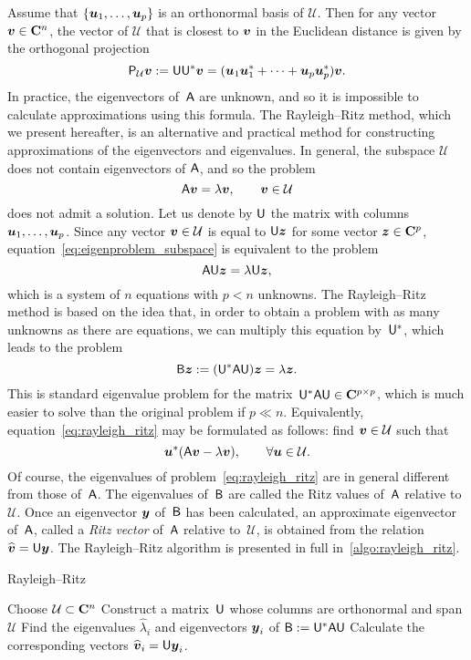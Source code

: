 Assume that $\{\mathbf{\boldsymbol{u}}_1, \dotsc, \mathbf{\boldsymbol{u}}_p\}$ is an orthonormal basis of $\mathcal U$.
Then for any vector $\mathbf{\boldsymbol{v}} \in \mathbf C^{n}$,
the vector of $\mathcal U$ that is closest to $\mathbf{\boldsymbol{v}}$ in the Euclidean distance is given by the orthogonal projection
\[
    \mathsf P_{\mathcal U} \mathbf{\boldsymbol{v}} := \mathsf U \mathsf U^* \mathbf{\boldsymbol{v}} = (\mathbf{\boldsymbol{u}}_1 \mathbf{\boldsymbol{u}}_1^* + \dotsb + \mathbf{\boldsymbol{u}}_p \mathbf{\boldsymbol{u}}_p^*) \mathbf{\boldsymbol{v}}.
\]
In practice,
the eigenvectors of~$\mathsf A$ are unknown,
and so it is impossible to calculate approximations using this formula.
The Rayleigh--Ritz method,
which we present hereafter,
is an alternative and practical method for constructing approximations of the eigenvectors and eigenvalues.
In general, the subspace $\mathcal U$ does not contain eigenvectors of $\mathsf A$,
and so the problem
\begin{equation}
    \label{eq:eigenproblem_subspace}
    \mathsf A \mathbf{\boldsymbol{v}} = \lambda \mathbf{\boldsymbol{v}}, \qquad \mathbf{\boldsymbol{v}} \in \mathcal U
\end{equation}
does not admit a solution.
Let us denote by $\mathsf U$ the matrix with columns~$\mathbf{\boldsymbol{u}}_1, \dotsc, \mathbf{\boldsymbol{u}}_p$.
Since any vector $\mathbf{\boldsymbol{v}} \in \mathcal U$ is equal to $\mathsf U \mathbf{\boldsymbol{z}}$ for some vector $\mathbf{\boldsymbol{z}} \in \mathbf C^p$,
equation~\eqref{eq:eigenproblem_subspace} is equivalent to the problem
\[
    \mathsf A \mathsf U \mathbf{\boldsymbol{z}} = \lambda \mathsf U \mathbf{\boldsymbol{z}},
\]
which is a system of $n$ equations with $p < n$ unknowns.
The Rayleigh--Ritz method is based on the idea that,
in order to obtain a problem with as many unknowns as there are equations,
we can multiply this equation by~$\mathsf U^*$,
which leads to the problem
\begin{equation}
    \label{eq:rayleigh_ritz}
    \mathsf B \mathbf{\boldsymbol{z}} := (\mathsf U^* \mathsf A \mathsf U) \mathbf{\boldsymbol{z}} = \lambda \mathbf{\boldsymbol{z}}.
\end{equation}
This is standard eigenvalue problem for the matrix~$\mathsf U^* \mathsf A \mathsf U \in \mathbf C^{p \times p}$,
which is much easier to solve than the original problem if $p \ll n$.
Equivalently, equation~\eqref{eq:rayleigh_ritz} may be formulated as follows: find $\mathbf{\boldsymbol{v}} \in \mathcal U$
such that
\[
    \mathbf{\boldsymbol{u}}^* (\mathsf A \mathbf{\boldsymbol{v}} - \lambda \mathbf{\boldsymbol{v}}), \qquad \forall \mathbf{\boldsymbol{u}} \in \mathcal U.
\]
Of course, the eigenvalues of problem~\eqref{eq:rayleigh_ritz} are in general different from those of~$\mathsf A$.
The eigenvalues of~$\mathsf B$ are called the Ritz values of~$\mathsf A$ relative to $\mathcal U$.
Once an eigenvector $\mathbf{\boldsymbol{y}}$ of~$\mathsf B$ has been calculated,
an approximate eigenvector of~$\mathsf A$,
called a \emph{Ritz vector} of~$\mathsf A$ relative to~$\mathcal U$,
is obtained from the relation $\widehat {\mathbf{\boldsymbol{v}}} = \mathsf U \mathbf{\boldsymbol{y}}$.
The Rayleigh--Ritz algorithm is presented in full in~\cref{algo:rayleigh_ritz}.
\begin{algorithm}
\caption{Rayleigh--Ritz}%
\label{algo:rayleigh_ritz}%
\begin{algorithmic}
\State Choose $\mathcal U \subset \mathbf C^n$
\State Construct a matrix~$\mathsf U$ whose columns are orthonormal and span $\mathcal U$
\State Find the eigenvalues $\widehat \lambda_i$ and eigenvectors $\mathbf{\boldsymbol{y}}_i$ of $\mathsf B:= \mathsf U^* \mathsf A \mathsf U$
\State Calculate the corresponding vectors $\widehat {\mathbf{\boldsymbol{v}}}_i = \mathsf U \mathbf{\boldsymbol{y}}_i$.
\end{algorithmic}
\end{algorithm}

